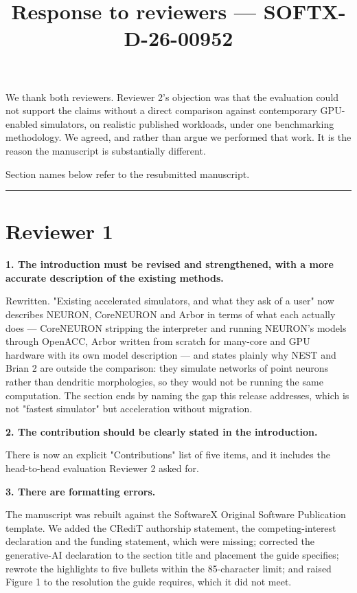 \documentclass[11pt,a4paper]{article}
\title{\vspace{-2em}Response to reviewers --- SOFTX-D-26-00952}
\date{}
\author{}
\begin{document}
\maketitle\vspace{-3em}

We thank both reviewers. Reviewer 2's objection was that the evaluation could not support the claims without a direct comparison against contemporary GPU-enabled simulators, on realistic published workloads, under one benchmarking methodology. We agreed, and rather than argue we performed that work. It is the reason the manuscript is substantially different.

Section names below refer to the resubmitted manuscript.

\medskip\hrule\medskip

\section*{Reviewer 1}

\textbf{1. The introduction must be revised and strengthened, with a more accurate description of the existing methods.}

Rewritten. "Existing accelerated simulators, and what they ask of a user" now describes NEURON, CoreNEURON and Arbor in terms of what each actually does --- CoreNEURON stripping the interpreter and running NEURON's models through OpenACC, Arbor written from scratch for many-core and GPU hardware with its own model description --- and states plainly why NEST and Brian 2 are outside the comparison: they simulate networks of point neurons rather than dendritic morphologies, so they would not be running the same computation. The section ends by naming the gap this release addresses, which is not "fastest simulator" but acceleration without migration.

\textbf{2. The contribution should be clearly stated in the introduction.}

There is now an explicit "Contributions" list of five items, and it includes the head-to-head evaluation Reviewer 2 asked for.

\textbf{3. There are formatting errors.}

The manuscript was rebuilt against the SoftwareX Original Software Publication template. We added the CRediT authorship statement, the competing-interest declaration and the funding statement, which were missing; corrected the generative-AI declaration to the section title and placement the guide specifies; rewrote the highlights to five bullets within the 85-character limit; and raised Figure 1 to the resolution the guide requires, which it did not meet.
\end{document}
